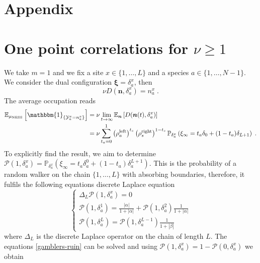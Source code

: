 \documentclass[10pt]{article}
\numberwithin{equation}{section}
\numberwithin{equation}{subsection}
\newcommand{\dt}{\;.}
\begin{document}
\appendix
\section*{Appendix}


\section{One point correlations for $\nu\geq 1$}\label{appendix-1pts-general}
We take $m=1$ and we fix a site $x\in\{1,\ldots,L\}$ and a species $a\in \{1,\ldots,N-1\}$. We consider the dual configuration $\bm{\xi}=\delta_{a}^{x}$, then 
\begin{equation}
	\nu D(\bm{n},\delta_{a}^{x})=n_{a}^{x}\dt
\end{equation}
The average occupation reads
\begin{equation}\label{OnePtsCORR}
	\begin{split}
			\mathbb{E}_{\mu_{\text{NESS}}}\left[\mathbbm{1}_{\{\mathcal{Y}_{a}^{x}=n_{a}^{x}\}}\right]&=\nu\lim_{t\to\infty}\mathbb{E}_{\bm{n}}\left[D(\bm{n}(t),\delta_{a}^{x})\right]\\&=\nu\sum_{t_{a}=0}^{1}\left(\rho_{a}^{\text{left}}\right)^{t_{s}}\left(\rho_{s}^{\text{right}}\right)^{1-t_{s}}\mathbb{P}_{\delta_{a}^{x}}\left(\xi_{\infty}=t_{a}\delta_{0}+(1-t_{a})\delta_{L+1}\right)\dt
	\end{split}
\end{equation}
To explicitly find the result, we aim to determine $\mathcal{P}(1,\delta_{a}^{x})=\mathbb{P}_{\delta_{a}^{x}}\left(\xi_{\infty}=t_{a}\delta_{a}^{0}+(1-t_{a})\delta_{a}^{L+1}\right)$. This is the probability of a random walker on the chain $\{1,\ldots,L\}$ with absorbing boundaries, therefore, it fulfils the following equations discrete Laplace equation
\begin{equation}\label{gamblers-ruin}
	\begin{cases}
		\Delta_{L}\mathcal{P}(1,\delta_{a}^{x})=0\\
		\mathcal{P}(1,\delta_{a}^{1})=\frac{|\alpha|}{1+|\alpha|}+\mathcal{P}(1,\delta_{a}^{2})\frac{1}{1+|\alpha|}\\
		\mathcal{P}(1,\delta_{a}^{L})=\mathcal{P}(1,\delta_{a}^{L-1})\frac{1}{1+|\beta|}
	\end{cases}
\end{equation}
where $\Delta_{L}$ is the discrete Laplace operator on the chain of length $L$. The equations \eqref{gamblers-ruin} can be solved and using $\mathcal{P}(1,\delta_{a}^{x})=1-\mathcal{P}(0,\delta_{a}^{x})$ we obtain 
\end{document}
